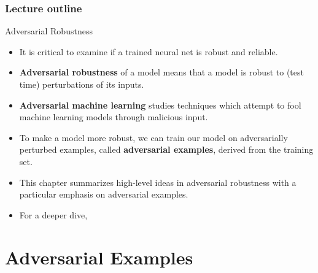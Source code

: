 
 






\newcommand{\Dsubtrain}{\mathcal{D}_{\text{subtrain}}}
\newcommand{\Dval}{\mathcal{D}_{\text{val}}}



\begin{frame}
\frametitle{Lecture outline}
\tableofcontents
\end{frame}


\begin{frame}{Adversarial Robustness}
    \begin{itemize}
        \item It is critical to examine if a trained neural net is robust and reliable. 
        \item \textbf{Adversarial robustness} of a model means that a model is robust to (test time) perturbations of its inputs. 
        \item \textbf{Adversarial machine learning} studies techniques which attempt  to fool machine learning models through malicious input.
        \item To make a model more robust, we can train our model on adversarially perturbed examples, called \textbf{adversarial examples}, derived from the training set.  
        \item This chapter summarizes  high-level ideas in adversarial robustness with a particular emphasis on adversarial examples.
        \item For a deeper dive, \href{https://adversarial-ml-tutorial.org/}{}
    \end{itemize}
\end{frame}


\section{Adversarial Examples}

